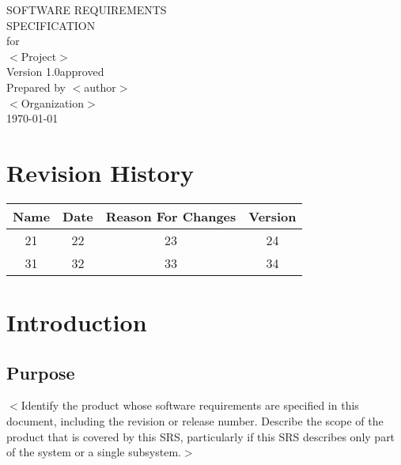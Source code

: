 \documentclass{scrreprt}
\def\myversion{1.0}
\begin{document}

\begin{flushright}
    \begin{bfseries}
        \Huge{SOFTWARE REQUIREMENTS\\ SPECIFICATION}\\
        \vspace{1.9cm}
        for\\
        \vspace{1.9cm}
        $<$Project$>$\\
        \vspace{1.9cm}
        \LARGE{Version \myversion approved}\\
        \vspace{1.9cm}
        Prepared by $<$author$>$\\
        \vspace{1.9cm}
        $<$Organization$>$\\
        \vspace{1.9cm}
        \today\\
    \end{bfseries}
\end{flushright}

\tableofcontents


\chapter*{Revision History}

\begin{center}
    \begin{tabular}{|c|c|c|c|}
        \hline
	    Name & Date & Reason For Changes & Version\\
        \hline
	    21 & 22 & 23 & 24\\
        \hline
	    31 & 32 & 33 & 34\\
        \hline
    \end{tabular}
\end{center}

\chapter{Introduction}

\section{Purpose}
$<$Identify the product whose software requirements are specified in this
document, including the revision or release number. Describe the scope of the
product that is covered by this SRS, particularly if this SRS describes only
part of the system or a single subsystem.$>$
\end{document}
